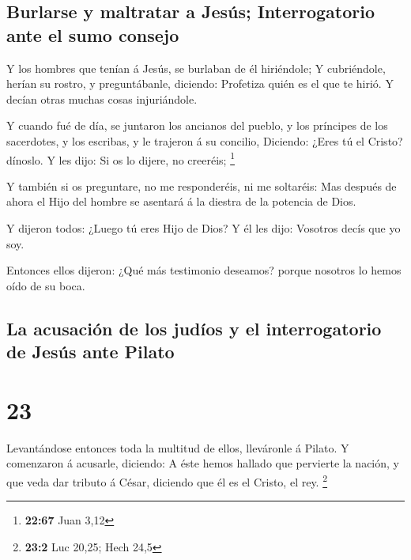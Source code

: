 \hypertarget{burlarse-y-maltratar-a-jesuxfas-interrogatorio-ante-el-sumo-consejo}{%
\subsection{Burlarse y maltratar a Jesús; Interrogatorio ante el sumo
consejo}\label{burlarse-y-maltratar-a-jesuxfas-interrogatorio-ante-el-sumo-consejo}}

 Y los hombres que tenían á Jesús, se burlaban de él
hiriéndole;  Y cubriéndole, herían su rostro, y
preguntábanle, diciendo: Profetiza quién es el que te hirió.
 Y decían otras muchas cosas injuriándole.

 Y cuando fué de día, se juntaron los ancianos del pueblo,
y los príncipes de los sacerdotes, y los escribas, y le trajeron á su
concilio,  Diciendo: ¿Eres tú el Cristo? dínoslo. Y les
dijo: Si os lo dijere, no creeréis; \footnote{\textbf{22:67} Juan 3,12}

 Y también si os preguntare, no me responderéis, ni me
soltaréis:  Mas después de ahora el Hijo del hombre se
asentará á la diestra de la potencia de Dios.

 Y dijeron todos: ¿Luego tú eres Hijo de Dios? Y él les
dijo: Vosotros decís que yo soy.

 Entonces ellos dijeron: ¿Qué más testimonio deseamos?
porque nosotros lo hemos oído de su boca.

\hypertarget{la-acusaciuxf3n-de-los-juduxedos-y-el-interrogatorio-de-jesuxfas-ante-pilato}{%
\subsection{La acusación de los judíos y el interrogatorio de Jesús ante
Pilato}\label{la-acusaciuxf3n-de-los-juduxedos-y-el-interrogatorio-de-jesuxfas-ante-pilato}}

\hypertarget{section-22}{%
\section{23}\label{section-22}}

 Levantándose entonces toda la multitud de ellos, lleváronle
á Pilato.  Y comenzaron á acusarle, diciendo: A éste hemos
hallado que pervierte la nación, y que veda dar tributo á César,
diciendo que él es el Cristo, el rey. \footnote{\textbf{23:2} Luc 20,25;
  Hech 24,5}

